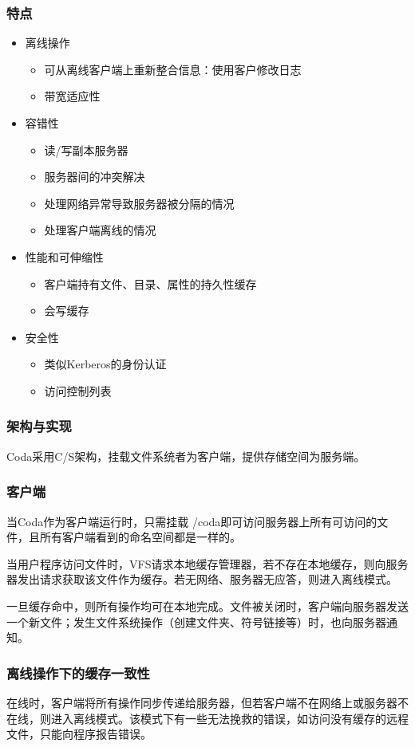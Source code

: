 \documentclass{ctexart}
\begin{document}
\subsubsection{特点}
\begin{itemize}
	\item 离线操作
	\begin{itemize}
		\item 可从离线客户端上重新整合信息：使用客户修改日志
		\item 带宽适应性
	\end{itemize}
	\item 容错性
	\begin{itemize}
		\item 读/写副本服务器
		\item 服务器间的冲突解决
		\item 处理网络异常导致服务器被分隔的情况
		\item 处理客户端离线的情况
	\end{itemize}
	\item 性能和可伸缩性
	\begin{itemize}
		\item 客户端持有文件、目录、属性的持久性缓存
		\item 会写缓存
	\end{itemize}
	\item 安全性
	\begin{itemize}
		\item 类似Kerberos的身份认证
		\item 访问控制列表
	\end{itemize}
\end{itemize}
\subsubsection{架构与实现}
Coda采用C/S架构，挂载文件系统者为客户端，提供存储空间为服务端。
\subsubsection{客户端}
当Coda作为客户端运行时，只需挂载 /coda即可访问服务器上所有可访问的文件，且所有客户端看到的命名空间都是一样的。

当用户程序访问文件时，VFS请求本地缓存管理器，若不存在本地缓存，则向服务器发出请求获取该文件作为缓存。若无网络、服务器无应答，则进入离线模式。

一旦缓存命中，则所有操作均可在本地完成。文件被关闭时，客户端向服务器发送一个新文件；发生文件系统操作（创建文件夹、符号链接等）时，也向服务器通知。
\subsubsection{离线操作下的缓存一致性}
在线时，客户端将所有操作同步传递给服务器，但若客户端不在网络上或服务器不在线，则进入离线模式。该模式下有一些无法挽救的错误，如访问没有缓存的远程文件，只能向程序报告错误。
\end{document}
